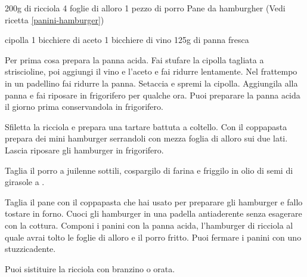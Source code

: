 \begin{ingreds}
	200g di ricciola
	4 foglie di alloro
	1 pezzo di porro
	Pane da hamburgher (Vedi ricetta \ref{panini-hamburger})
	
\columnbreak
{} cipolla
	1 bicchiere di aceto
	1 bicchiere di vino
	125g di panna fresca
\end{ingreds}

\begin{method}
Per prima cosa prepara la panna acida. Fai stufare la cipolla tagliata a striscioline, poi aggiungi il vino e l'aceto e fai ridurre lentamente. Nel frattempo in un padellino fai ridurre la panna. Setaccia e spremi la cipolla. Aggiungila alla panna e fai riposare in frigorifero per qualche ora. Puoi preparare la panna acida il giorno prima conservandola in frigorifero.

Sfiletta la ricciola e prepara una tartare battuta a coltello. Con il coppapasta prepara dei mini hamburger serrandoli con mezza foglia di alloro sui due lati. Lascia riposare gli hamburger in frigorifero.

Taglia il porro a juilenne sottili, cospargilo di farina e friggilo in olio di semi di girasole a .

Taglia il pane con il coppapasta che hai usato per preparare gli hamburger e fallo tostare in forno. Cuoci gli hamburger in una padella antiaderente senza esagerare con la cottura. Componi i panini con la panna acida, l'hamburger di ricciola al quale avrai tolto le foglie di alloro e il porro fritto. Puoi fermare i panini con uno stuzzicadente.
\end {method}
	\begin{note}
		Puoi sistituire la ricciola con branzino o orata.
	\end{note}
